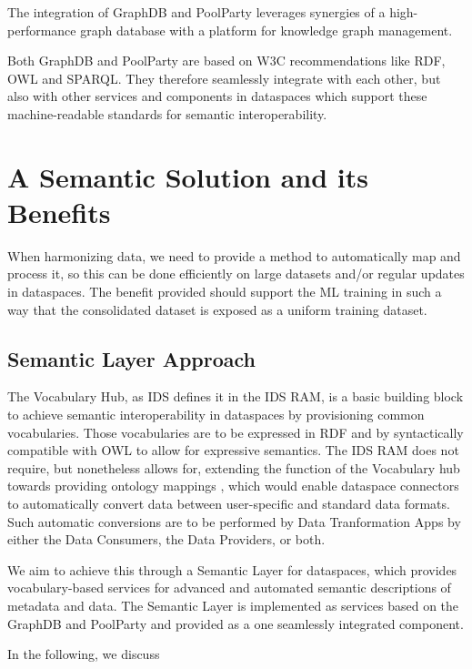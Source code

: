 \documentclass[
  super,
  preprint,
  3p]{elsarticle}
\begin{document}
The integration of GraphDB and PoolParty leverages synergies of a
high-performance graph database with a platform for knowledge graph
management.

Both GraphDB and PoolParty are based on W3C recommendations like RDF,
OWL and SPARQL. They therefore seamlessly integrate with each other, but
also with other services and components in dataspaces which support
these machine-readable standards for semantic interoperability.

\section{A Semantic Solution and its
Benefits}\label{a-semantic-solution-and-its-benefits}

When harmonizing data, we need to provide a method to automatically map
and process it, so this can be done efficiently on large datasets and/or
regular updates in dataspaces. The benefit provided should support the
ML training in such a way that the consolidated dataset is exposed as a
uniform training dataset.

\subsection{Semantic Layer Approach}\label{semantic-layer-approach}

The Vocabulary Hub, as IDS defines it in the IDS RAM, is a basic
building block to achieve semantic interoperability in dataspaces by
provisioning common vocabularies. Those vocabularies are to be expressed
in RDF and by syntactically compatible with OWL to allow for expressive
semantics. The IDS RAM does not require, but nonetheless allows for,
extending the function of the Vocabulary hub towards providing ontology
mappings \citep{FunctionalLayerIDSRAM2023b}, which would enable
dataspace connectors to automatically convert data between user-specific
and standard data formats. Such automatic conversions are to be
performed by Data Tranformation Apps by either the Data Consumers, the
Data Providers, or both.

We aim to achieve this through a Semantic Layer for dataspaces, which
provides vocabulary-based services for advanced and automated semantic
descriptions of metadata and data. The Semantic Layer is implemented as
services based on the GraphDB and PoolParty and provided as a one
seamlessly integrated component.

In the following, we discuss
\end{document}
